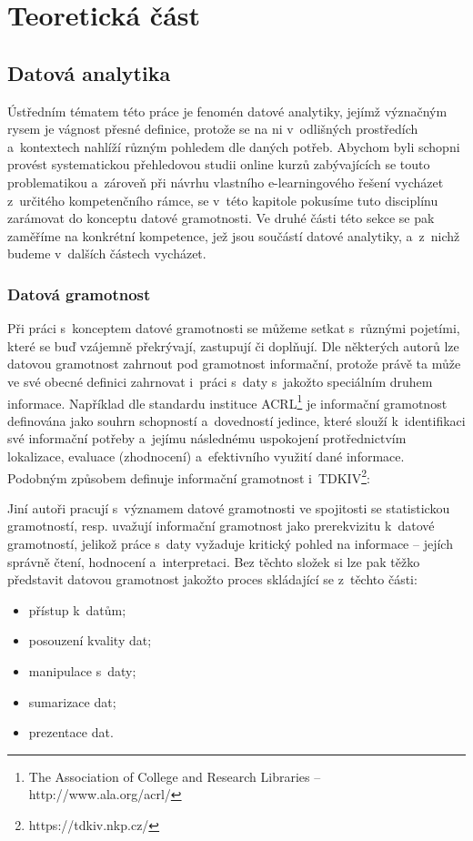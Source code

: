 \part{Teoretická část}

\hypertarget{datovuxe1-analytika}{%
\chapter{Datová analytika}\label{datovuxe1-analytika}}

Ústředním tématem této práce je fenomén datové analytiky, jejímž
význačným rysem je vágnost přesné definice, protože se na ni v~odlišných
prostředích a~kontextech nahlíží různým pohledem dle daných potřeb.
Abychom byli schopni provést systematickou přehledovou studii online
kurzů zabývajících se touto problematikou a~zároveň při návrhu vlastního
e-learningového řešení vycházet z~určitého kompetenčního rámce, se
v~této kapitole pokusíme tuto disciplínu zarámovat do konceptu datové
gramotnosti. Ve druhé části této sekce se pak zaměříme na konkrétní
kompetence, jež jsou součástí datové analytiky, a~z~nichž budeme
v~dalších částech vycházet.

\hypertarget{datovuxe1-gramotnost}{%
\section{Datová gramotnost}\label{datovuxe1-gramotnost}}

Při práci s~konceptem datové gramotnosti se můžeme setkat s~různými
pojetími, které se buď vzájemně překrývají, zastupují či doplňují. Dle
některých autorů lze datovou gramotnost zahrnout pod gramotnost
informační, protože právě ta může ve své obecné definici zahrnovat
i~práci s~daty s~jakožto speciálním druhem informace.
\parencite[126]{calzada13} Například dle standardu instituce
ACRL\footnote{The Association of College and Research Libraries – http://www.ala.org/acrl/}
je informační gramotnost definována jako souhrn schopností a~dovedností
jedince, které slouží k~identifikaci své informační potřeby a~jejímu
následnému uspokojení protřednictvím lokalizace, evaluace (zhodnocení)
a~efektivního využití dané informace.~\parencite[2]{acrl06} Podobným
způsobem definuje informační gramotnost
i~TDKIV\footnote{https://tdkiv.nkp.cz/}:
\parencite{tdkiv03}

Jiní autoři pracují s~významem datové gramotnosti ve spojitosti se
statistickou gramotností, resp. uvažují informační gramotnost jako
prerekvizitu k~datové gramotností, jelikož práce s~daty vyžaduje
kritický pohled na informace -- jejích správně čtení, hodnocení
a~interpretaci. Bez těchto složek si lze pak těžko představit datovou
gramotnost jakožto proces skládající se z~těchto části:
\parencite[8]{schield05}

\begin{itemize}
\tightlist
\item
  přístup k~datům;
\item
  posouzení kvality dat;
\item
  manipulace s~daty;
\item
  sumarizace dat;
\item
  prezentace dat.
\end{itemize}
